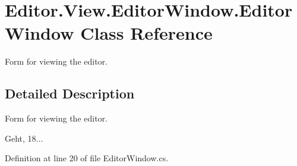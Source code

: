\section{Editor.\-View.\-Editor\-Window.\-Editor\-Window Class Reference}
\label{class_editor_1_1_view_1_1_editor_window_1_1_editor_window}


Form for viewing the editor.  




\subsection{Detailed Description}
Form for viewing the editor. 

Geht, 18... 

Definition at line 20 of file Editor\-Window.\-cs.

